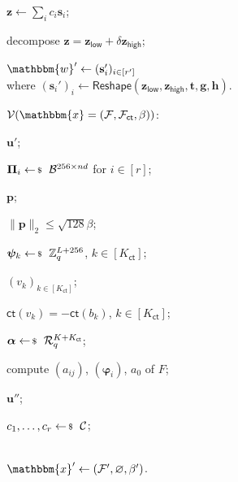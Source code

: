 \documentclass[../../book.tex]{subfiles}
\begin{document}
\begin{algoproto}[ht]
\begin{mdframed}[linecolor=black, linewidth=1pt,
                     skipabove=10pt, skipbelow=10pt,
                     innerleftmargin=5pt, innerrightmargin=5pt]
\begin{minipage}[t]{0.52\linewidth}
\begin{algoen}
                \item $\mathbf{z} \gets \sum_{i} c_i\mathbf{s}_i$;
                \item \colorbox{oc-orange-1}{decompose $\mathbf{z} = \mathbf{z}_{\mathsf{low}} + \delta\mathbf{z}_{\mathsf{high}}$;}
                \item \colorbox{oc-orange-1}{ $\mathbbm{w}' \gets (\mathbf{s}_i')_{i \in [r']}$} \\ \colorbox{oc-orange-1}{where $(\mathbf{s}_i')_i \gets \mathsf{Reshape}(\mathbf{z}_{\mathsf{low}}, \mathbf{z}_{\mathsf{high}}, \mathbf{t}, \mathbf{g}, \mathbf{h})$}.
            \end{algoen}
        \end{minipage}
        \hfill
        \begin{minipage}[t]{0.45\linewidth}
            \colorbox{oc-blue-1}{$\mathcal{V}(\mathbbm{x} = (\mathcal{F}, \mathcal{F}_{\mathsf{ct}}, \beta))$:}
            \begin{algoen}
                \item {} \colorbox{oc-orange-1}{$\mathbf{u}'$};
                \item {} $\boldsymbol{\Pi}_i \leftarrowS \mathcal{B}^{256 \times nd}$ for $i \in [r]$;
                \item {} $\mathbf{p}$;
                \item {} $\|\mathbf{p}\|_2 \leq \sqrt{128}\beta$;
                \item {} $\boldsymbol{\psi}_k \leftarrowS \mathbb{Z}_q^{L+256}$, $k \in [K_{\mathsf{ct}}]$;
                \item {} $(v_k)_{k \in [K_{\mathsf{ct}}]}$;
                \item {} $\mathsf{ct}(v_k) = -\mathsf{ct}(b_k)$, $k \in [K_{\mathsf{ct}}]$;
                \item {} $\boldsymbol{\alpha} \leftarrowS \mathcal{R}_q^{K+K_{\mathsf{ct}}}$;
                \item compute $(a_{ij})$, $(\boldsymbol{\varphi}_i)$, $a_0$ of $F$;
                \item {} \colorbox{oc-orange-1}{$\mathbf{u}''$};
                \item {} $c_1, \dots, c_r \leftarrowS \mathcal{C}$;
                \item {} \\ \colorbox{oc-orange-1}{ $\mathbbm{x}' \gets (\mathcal{F}', \varnothing, \beta')$}.

\end{algoen}
\end{minipage}
\end{mdframed}
\end{algoproto}
\end{document}
